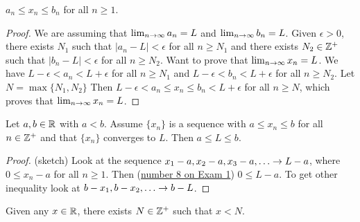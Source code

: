 \documentclass[]{article}
\begin{document}
\begin{example}
	[Exam 1, 7.] $a_n\leq x_n \leq b_n$ for all $n\geq 1$.
\end{example}
\begin{proof}
	We are assuming that $\lim_{n\rightarrow\infty} a_n = L$ and $\lim_{n\rightarrow\infty} b_n = L$. Given $\epsilon>0$, there exists $N_1$ such that $|a_n-L|<\epsilon$ for all $n\geq N_1$ and there exists $N_2\in\mathbb{Z}^+$ such that $|b_n-L|<\epsilon$ for all $n\geq N_2$.
	Want to prove that $\lim_{n\rightarrow\infty} x_n = L$. We have $L-\epsilon<a_n<L+\epsilon$ for all $n\geq N_1$ and $L-\epsilon<b_n<L+\epsilon$ for all $n\geq N_2$.
	Let $N=\max{\{N_1,N_2\}}$ Then $L-\epsilon<a_n\leq x_n\leq b_n<L+\epsilon$ for all $n\geq N$, which proves that $\lim_{n\rightarrow\infty} x_n=L$.
\end{proof}

\begin{theorem}
	Let $a,b\in\mathbb{R}$ with $a<b$. Assume $\{x_n\}$ is a sequence with $a\leq x_n \leq b$ for all $n\in \mathbb{Z}^+$ and that $\{x_n\}$ converges to $L$. Then $a\leq L\leq b$.
	\label{thm5}
\end{theorem}
\begin{proof}
	(sketch) Look at the sequence $x_1-a,x_2-a,x_3-a,\dots \ra L-a$, where $0\leq x_n -a$ for all $n\geq 1$. Then (\ul{number 8 on Exam 1}) $0\leq L-a$. To get other inequality look at $b-x_1,b-x_2,\dots \ra b-L$.
\end{proof}

\begin{recall}
	 Given any $x\in \mathbb{R}$, there exists $N \in \mathbb{Z}^+$ such that $x<N$.
\end{recall}
\end{document}
